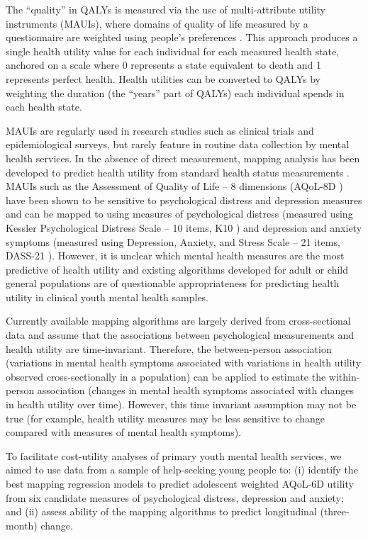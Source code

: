 \documentclass[
  journal=largetwo,
  manuscript=original-article,
  year=2023-Submission,
]{cup-journal}
\begin{document}
The ``quality'' in QALYs is measured via the use of multi-attribute utility instruments (MAUIs), where domains of quality of life measured by a questionnaire are weighted using people's preferences \autocite{RN3418}. This approach produces a single health utility value for each individual for each measured health state, anchored on a scale where 0 represents a state equivalent to death and 1 represents perfect health. Health utilities can be converted to QALYs by weighting the duration (the ``years'' part of QALYs) each individual spends in each health state.

MAUIs are regularly used in research studies such as clinical trials and epidemiological surveys, but rarely feature in routine data collection by mental health services. In the absence of direct measurement, mapping analysis has been developed to predict health utility from standard health status measurements \autocite{RN7,Wailoo2017}. MAUIs such as the Assessment of Quality of Life -- 8 dimensions (AQoL-8D \autocite{Richardson2014}) have been shown to be sensitive to psychological distress and depression measures \autocite{RN6} and can be mapped to \autocite{RN4} using measures of psychological distress (measured using Kessler Psychological Distress Scale -- 10 items, K10 \autocite{RN16}) and depression and anxiety symptoms (measured using Depression, Anxiety, and Stress Scale -- 21 items, DASS-21 \autocite{henry_2005}). However, it is unclear which mental health measures are the most predictive of health utility and existing algorithms developed for adult \autocite{RN4} or child \autocite{pmid23943259} general populations are of questionable appropriateness for predicting health utility in clinical youth mental health samples.

Currently available mapping algorithms are largely derived from cross-sectional data and assume that the associations between psychological measurements and health utility are time-invariant. Therefore, the between-person association (variations in mental health symptoms associated with variations in health utility observed cross-sectionally in a population) can be applied to estimate the within-person association (changes in mental health symptoms associated with changes in health utility over time). However, this time invariant assumption may not be true (for example, health utility measures may be less sensitive to change compared with measures of mental health symptoms).

To facilitate cost-utility analyses of primary youth mental health services, we aimed to use data from a sample of help-seeking young people to: (i) identify the best mapping regression models to predict adolescent weighted AQoL-6D utility from six candidate measures of psychological distress, depression and anxiety; and (ii) assess ability of the mapping algorithms to predict longitudinal (three-month) change.
\end{document}
